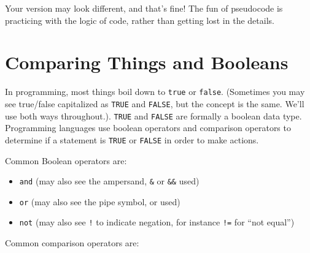 \documentclass[
]{book}
\providecommand{\tightlist}{%
  \setlength{\itemsep}{0pt}\setlength{\parskip}{0pt}}
\begin{document}
Your version may look different, and that's fine! The fun of pseudocode is practicing with the logic of code, rather than getting lost in the details.

\hfill\break

\section{Comparing Things and Booleans}\label{comparing-things-and-booleans}

In programming, most things boil down to \texttt{true} or \texttt{false}. (Sometimes you may see true/false capitalized as \texttt{TRUE} and \texttt{FALSE}, but the concept is the same. We'll use both ways throughout.). \texttt{TRUE} and \texttt{FALSE} are formally a boolean data type. Programming languages use boolean operators and comparison operators to determine if a statement is \texttt{TRUE} or \texttt{FALSE} in order to make actions.

Common Boolean operators are:\\

\begin{itemize}
\tightlist
\item
  \texttt{and} (may also see the ampersand, \texttt{\&} or \texttt{\&\&} used)
\item
  \texttt{or} (may also see the pipe symbol, \texttt{\textbar{}} or \texttt{\textbar{}\textbar{}} used)
\item
  \texttt{not} (may also see \texttt{!} to indicate negation, for instance \texttt{!=} for ``not equal'')
\end{itemize}

Common comparison operators are:
\end{document}
